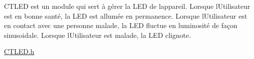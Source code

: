 CTLED est un module qui sert à gérer la LED de l\textquotesingle{}appareil. Lorsque l\textquotesingle{}Utilisateur est en bonne santé, la LED est allumée en permanence. Lorsque l\textquotesingle{}Utilisateur est en contact avec une personne malade, la LED fluctue en luminosité de façon sinusoidale. Lorsque l\textquotesingle{}Utilisateur est malade, la LED clignote.

\mbox{\hyperlink{_c_t_l_e_d_8h}{CTLED.\+h}} 